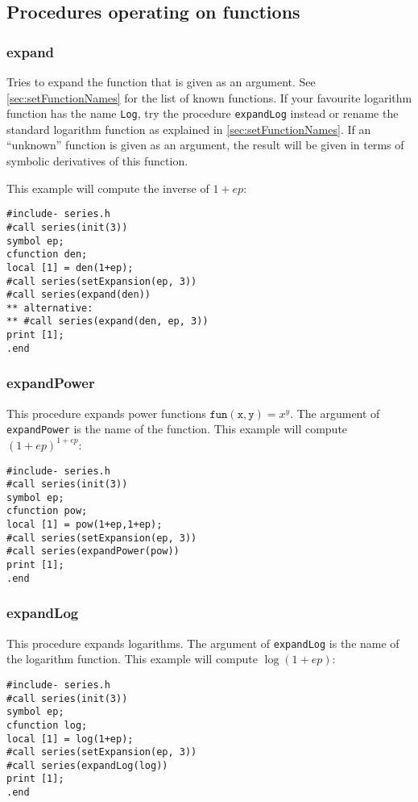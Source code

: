 \documentclass[titlepage]{article}
\begin{document}
\subsection{Procedures operating on functions}
\label{sec:proc_fun}

\subsubsection{expand}
\label{sec:expand}

Tries to expand the function that is given as an argument. See
\ref{sec:setFunctionNames} for the list of known functions. If your
favourite logarithm function has the name {\tt Log}, try the procedure
{\tt expandLog} instead or rename the standard logarithm function as
explained in \ref{sec:setFunctionNames}. If an ``unknown'' function is
given as an argument, the result will be given in terms of symbolic
derivatives of this function.

This example will compute the
inverse of $1+ep$:
\begin{lstlisting}
#include- series.h
#call series(init(3))
symbol ep;
cfunction den;
local [1] = den(1+ep);
#call series(setExpansion(ep, 3))
#call series(expand(den))
** alternative:
** #call series(expand(den, ep, 3))
print [1];
.end
\end{lstlisting}

\subsubsection{expandPower}
\label{sec:pow_fun}

This procedure expands power functions $\mathtt{fun(x,y)} = x^y$. The
argument of {\tt expandPower} is the name of the function. This example
will compute $(1+ep)^{1+ep}$:
\begin{lstlisting}
#include- series.h
#call series(init(3))
symbol ep;
cfunction pow;
local [1] = pow(1+ep,1+ep);
#call series(setExpansion(ep, 3))
#call series(expandPower(pow))
print [1];
.end
\end{lstlisting}

\subsubsection{expandLog}
\label{sec:log_fun}

This procedure expands logarithms. The argument of {\tt expandLog} is the name of the
logarithm function. This example will compute $\log(1+ep)$:
\begin{lstlisting}
#include- series.h
#call series(init(3))
symbol ep;
cfunction log;
local [1] = log(1+ep);
#call series(setExpansion(ep, 3))
#call series(expandLog(log))
print [1];
.end
\end{lstlisting}
\end{document}
